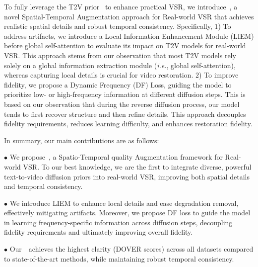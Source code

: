 To fully leverage the T2V prior~\cite{zhang2023i2vgen, yang2024cogvideox} to enhance practical VSR, we introduce~\name, a novel Spatial-Temporal Augmentation approach for Real-world VSR that achieves realistic spatial details and robust temporal consistency.
%
Specifically,
$1$) To address artifacts, we introduce a Local Information Enhancement Module (LIEM) before global self-attention to evaluate its impact on T2V models for real-world VSR. 
This approach stems from our observation that most T2V models rely solely on a global information extraction module (\textit{i.e.}, global self-attention), whereas capturing local details is crucial for video restoration.
$2$) To improve fidelity, we propose a Dynamic Frequency (DF) Loss, guiding the model to prioritize low- or high-frequency information at different diffusion steps. 
This is based on our observation that during the reverse diffusion process, our model tends to first recover structure and then refine details. This approach decouples fidelity requirements, reduces learning difficulty, and enhances restoration fidelity.


In summary, our main contributions are as follows:

$\bullet$ 
We propose~\name, a Spatio-Temporal quality Augmentation framework for Real-world VSR.
To our best knowledge, we are the first to integrate diverse, powerful text-to-video diffusion priors into real-world VSR, improving both spatial details and temporal consistency.

$\bullet$ 
We introduce LIEM to enhance local details and ease degradation removal, effectively mitigating artifacts. 
Moreover, we propose DF loss to guide the model in learning frequency-specific information across diffusion steps, decoupling fidelity requirements and ultimately improving overall fidelity.

$\bullet$ Our~\name~achieves the highest clarity (DOVER scores) across all datasets compared to state-of-the-art methods, while maintaining robust temporal consistency.